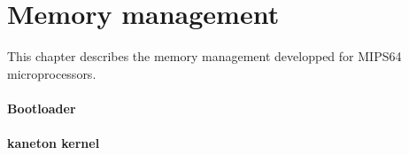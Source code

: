 %
%
%
%
%
%

%
%

\chapter{Memory management}

This chapter describes the memory management developped for MIPS64 microprocessors.

\subsubsection{Bootloader}

\subsubsection{kaneton kernel}
